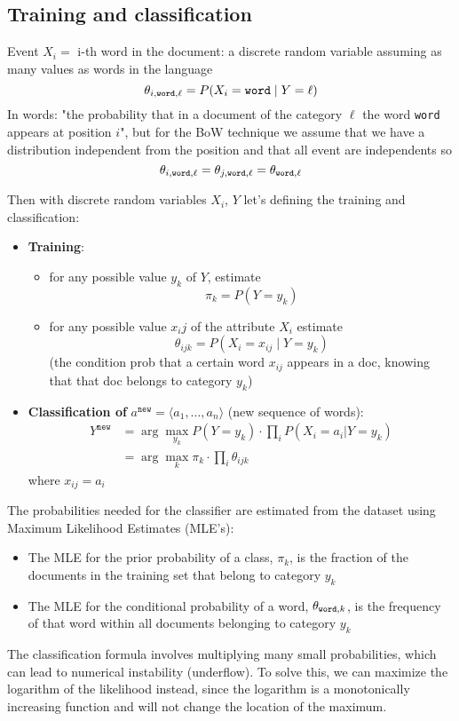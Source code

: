 \subsection{Training and classification}
Event $X_i=$ i-th word in the document: a discrete random variable assuming as many values as words in the language
\[
    \theta_{i,\text{\texttt{word}},\ell} = P(X_i = \text{\texttt{word}} \mid Y = \ell)
\]
In words: "the probability that in a document of the category $\ell$ the word
\texttt{word} appears at position $i$", but for the BoW technique we assume that we have a distribution independent from the position and that all event are independents so 
\[
     \theta_{i,\text{\texttt{word}},\ell} =  \theta_{j,\text{\texttt{word}},\ell}= \theta_{\text{\texttt{word}},\ell}
\]

Then with discrete random variables $X_i$, $Y$ let's defining the training and classification:
\begin{itemize}
    \item \textbf{Training}: 
    \begin{itemize}
        \item for any possible value $y_k$ of $Y$, estimate
        \[
            \pi_k=P(Y=y_k)
        \]
        \item for any possible value $x_ij$ of the attribute $X_i$ estimate
        \[
            \theta_{ijk} = P(X_i = x_{ij} \mid Y = y_k )
        \]
        (the condition prob that a certain word $x_{ij}$ appears in a doc, knowing that that doc belongs to category $y_k$)
    \end{itemize}
    \item \textbf{Classification of} $a^{\texttt{new}} = \langle a_1,\dots,a_n \rangle$ (new sequence of words):
    \[
    \begin{align*}
        Y^{\texttt{new}} &=\arg\max_{y_k} P(Y = y_k) \cdot \prod_{i} P(X_i = a_i | Y = y_k)\\
        & = \arg\max_{k}\pi_k\cdot \prod_{i}\theta_{ijk}
    \end{align*}
    \]
    where $x_{ij} = a_i$
\end{itemize} 

The probabilities needed for the classifier are estimated from the dataset using Maximum Likelihood Estimates (MLE's):
\begin{itemize}
    \item The MLE for the prior probability of a class, $\pi_k$, is the fraction of the documents in the training set that belong to category $y_k$
    \item The MLE for the conditional probability of a word, $\theta_{\text{\texttt{word}},k}$, is the frequency of that word within all documents belonging to category $y_k$
\end{itemize}
The classification formula involves multiplying many small probabilities, which can lead to numerical instability (underflow). To solve this, we can maximize the logarithm of the likelihood instead, since the logarithm is a monotonically increasing function and will not change the location of the maximum.

